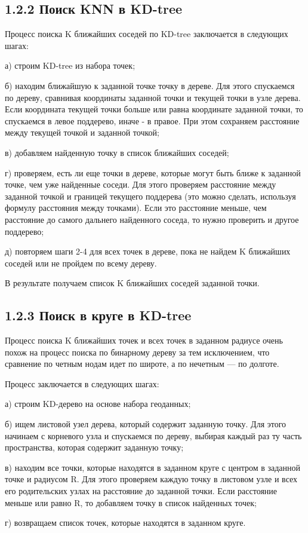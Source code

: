 \subsection{1.2.2 Поиск KNN в KD-tree}

Процесс поиска K ближайших соседей по KD-tree заключается в следующих шагах:
\par а) строим KD-tree из набора точек;
\par б) находим ближайшую к заданной точке точку в дереве. Для этого спускаемся по дереву, сравнивая координаты заданной точки и текущей точки в узле дерева. Если координата текущей точки больше или равна координате заданной точки, то спускаемся в левое поддерево, иначе - в правое. При этом сохраняем расстояние между текущей точкой и заданной точкой;
\par в) добавляем найденную точку в список ближайших соседей;
\par г) проверяем, есть ли еще точки в дереве, которые могут быть ближе к заданной точке, чем уже найденные соседи. Для этого проверяем расстояние между заданной точкой и границей текущего поддерева (это можно сделать, используя формулу расстояния между точками). Если это расстояние меньше, чем расстояние до самого дальнего найденного соседа, то нужно проверить и другое поддерево;
\par д) повторяем шаги 2-4 для всех точек в дереве, пока не найдем K ближайших соседей или не пройдем по всему дереву.

В результате получаем список K ближайших соседей заданной точки. 

\subsection{1.2.3 Поиск в круге в KD-tree}
Процесс поиска K ближайших точек и всех точек в заданном радиусе очень похож на процесс поиска по бинарному дереву за тем исключением, что сравнение по четным нодам идет по широте, а по нечетным — по долготе. 

Процесс заключается в следующих шагах:
\par а) строим KD-дерево на основе набора геоданных;
\par б) ищем листовой узел дерева, который содержит заданную точку. Для этого начинаем с корневого узла и спускаемся по дереву, выбирая каждый раз ту часть пространства, которая содержит заданную точку;
\par в) находим все точки, которые находятся в заданном круге с центром в заданной точке и радиусом R. Для этого проверяем каждую точку в листовом узле и всех его родительских узлах на расстояние до заданной точки. Если расстояние меньше или равно R, то добавляем точку в список найденных точек;
\par г) возвращаем список точек, которые находятся в заданном круге.


